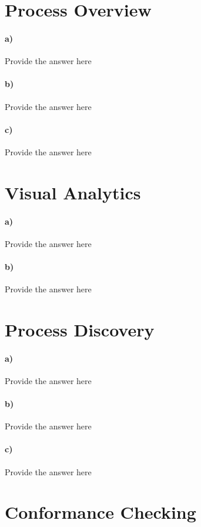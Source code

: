 \documentclass[12pt]{report}
\begin{document}
\section{Process Overview}
\paragraph{a)} \textlangle Provide the answer here\textrangle
\paragraph{b)} \textlangle Provide the answer here\textrangle
\paragraph{c)} \textlangle Provide the answer here\textrangle

\section{Visual Analytics}
\paragraph{a)} \textlangle Provide the answer here\textrangle
\paragraph{b)} \textlangle Provide the answer here\textrangle

\section{Process Discovery}
\paragraph{a)} \textlangle Provide the answer here\textrangle
\paragraph{b)} \textlangle Provide the answer here\textrangle
\paragraph{c)} \textlangle Provide the answer here\textrangle

\section{Conformance Checking}
\end{document}
